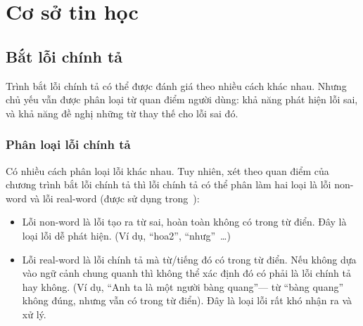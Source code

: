 \documentclass[a4paper,oneside,14pt]{extbook} %
\begin{document}

\chapter{Cơ sở tin học}
\label{cha:math}
\minitoc



\section{Bắt lỗi chính tả}

Trình bắt lỗi chính tả có thể được đánh giá theo nhiều cách khác
nhau. Nhưng chủ yếu vẫn được phân loại từ quan điểm người dùng: khả
năng phát hiện lỗi sai, và khả năng đề nghị những từ thay thế cho lỗi
sai đó.

\subsection{Phân loại lỗi chính tả}

Có nhiều cách phân loại lỗi khác nhau. Tuy nhiên, xét theo quan điểm của
chương trình bắt lỗi chính tả thì lỗi chính tả có thể phân làm hai
loại là lỗi non-word và lỗi real-word (được sử dụng trong~\cite{Tuoi}):
\begin{itemize}
\item Lỗi non-word là lỗi tạo ra từ sai, hoàn toàn không có trong từ
  điển. Đây là loại lỗi dễ phát hiện. (Ví dụ, ``hoa2'',
  ``nhưg''~\ldots)
\item Lỗi real-word là lỗi chính tả mà từ/tiếng đó có trong từ điển. Nếu
  không dựa vào ngữ cảnh chung quanh thì không thể xác định đó có phải
  là lỗi chính tả hay không. (Ví dụ, ``Anh ta là một người bàng
  quang''--- từ ``bàng quang'' không đúng, nhưng vẫn có trong từ
  điển). Đây là loại lỗi rất khó nhận ra và xử lý.
\end{itemize}
\end{document}
